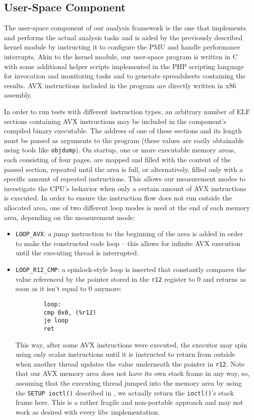 \subsection{User-Space Component}
\label{sec:analysis:design:userspace}

The user-space component of our analysis framework is the one that implements and performs the actual analysis tasks and is aided by the previously described kernel module by instructing it to configure the \gls{PMU} and handle performance interrupts. Akin to the kernel module, our user-space program is written in C with some additional helper scripts implemented in the PHP scripting language for invocation and monitoring tasks and to generate spreadsheets containing the results. \gls{AVX} instructions included in the program are directly written in x86 assembly.

In order to run tests with different instruction types, an arbitrary number of \gls{ELF} sections containing \gls{AVX} instructions may be included in the component's compiled binary executable. The address of one of these sections and its length must be passed as arguments to the program (these values are easily obtainable using tools like \texttt{objdump}). On startup, one or more executable memory areas, each consisting of four pages, are mapped and filled with the content of the passed section, repeated until the area is full, or alternatively, filled only with a specific amount of repeated instructions. This allows our measurement modes to investigate the \gls{CPU}'s behavior when only a certain amount of \gls{AVX} instructions is executed. In order to ensure the instruction flow does not run outside the allocated area, one of two different loop modes is used at the end of each memory area, depending on the measurement mode:

\begin{itemize}
	\item \texttt{LOOP\_AVX}: a jump instruction to the beginning of the area is added in order to make the constructed code loop -- this allows for infinite \gls{AVX} execution until the executing thread is interrupted.
	\item \texttt{LOOP\_R12\_CMP}: a spinlock-style loop is inserted that constantly compares the value referenced by the pointer stored in the \texttt{r12} register to $0$ and returns as soon as it isn't equal to $0$ anymore:
		\begin{verbatim}
		loop:
		cmp 0x0, (%r12)
		je loop
		ret
		\end{verbatim}
		This way, after some \gls{AVX} instructions were executed, the executor may spin using only scalar instructions until it is instructed to return from outside when another thread updates the value underneath the pointer in \texttt{r12}. Note that our \gls{AVX} memory area does not have its own stack frame in any way, so, assuming that the executing thread jumped into the memory area by using the \texttt{SETUP ioctl()} described in , we actually return the \texttt{ioctl()}'s stack frame here. This is a rather fragile and non-portable approach and may not work as desired with every \gls{libc} implementation.
\end{itemize}

